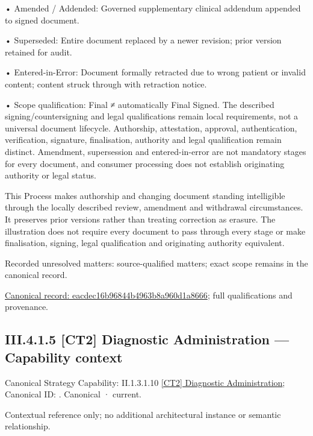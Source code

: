 •
Amended / Addended: Governed supplementary clinical addendum appended to signed document.



•
Superseded: Entire document replaced by a newer revision; prior version retained for audit.



•
Entered-in-Error: Document formally retracted due to wrong patient or invalid content; content struck through with retraction notice.



•
Scope qualification: Final ≠ automatically Final Signed. The described signing/countersigning and legal qualifications remain local requirements, not a universal document lifecycle. Authorship, attestation, approval, authentication, verification, signature, finalisation, authority and legal qualification remain distinct. Amendment, supersession and entered-in-error are not mandatory stages for every document, and consumer processing does not establish originating authority or legal status.



This Process makes authorship and changing document standing intelligible through the locally described review, amendment and withdrawal circumstances. It preserves prior versions rather than treating correction as erasure. The illustration does not require every document to pass through every stage or make finalisation, signing, legal qualification and originating authority equivalent.


{\small Recorded unresolved matters: source-qualified matters; exact scope remains in the canonical record.}\par
{\footnotesize \href{../../../../continuum/business/business-process/eacdec16b96844b4963b8a960d1a8666.md}{Canonical record: eacdec16b96844b4963b8a960d1a8666}; full qualifications and provenance.}\par
\subsection*{III.4.1.5 [CT2] Diagnostic Administration — Capability context}
\label{navigation:III.4.1.5}

{\small Canonical Strategy Capability: II.1.3.1.10 \hyperref[element:3cc720ba2e8b4d7a94bb349391d61895]{[CT2] Diagnostic Administration}; Canonical ID: \texttt{}. Canonical · current.}\par
Contextual reference only; no additional architectural instance or semantic relationship.\par
